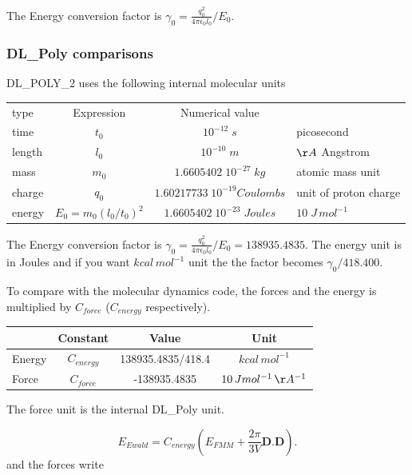 \documentclass[12pt]{article} %
\begin{document}
The Energy conversion factor is $\displaystyle \gamma_0 = \frac{q_0^2}{4 \pi\epsilon_0 l_0}/E_0 $. 


\subsubsection{DL\_Poly comparisons}
DL\_POLY\_2 uses the following internal molecular units \\

\begin{tabular}{|l|c|c|l|}
\hline
type & Expression & Numerical value & \\
time &$t_0$ & $10^{-12}\;s$& picosecond\\
length & $l_0$ &$10^{-10}\; m $& $\AA$ Angstrom\\
mass &  $m_0$ & $ 1.6605402 \; 10^{−27}\; kg $& atomic mass unit\\
charge &  $q_0$ & $1.60217733 \; 10^{−19} Coulombs$& unit of proton charge\\
energy & $E_0 = m_0(l_0/t_0)^2$&$1.6605402 \;  10^{−23}\; Joules $ & $10\; J\, mol^{-1}$\\
\hline
\end{tabular}
The Energy conversion factor is $\displaystyle \gamma_0 = \frac{q_0^2}{4 \pi\epsilon_0 l_0}/E_0 = 138935.4835$. The energy unit is in Joules and if you want $kcal\, mol^{-1}$ unit the the factor becomes $\gamma_0/418.400$.

To compare with the molecular dynamics code, the forces and the energy is multiplied by $C_{force}$ ($C_{energy}$ respectively). 
\begin{center}
\begin{tabular}{|l|c|c|c|}
\hline
   & Constant & Value &  Unit \\
\hline
Energy & $C_{energy}$& 138935.4835/418.4 &  $kcal\, mol^{-1}$\\
Force &$C_{force}$& -138935.4835 &  $10\,J  mol^{-1}\, \AA^{-1}$\\
\hline
\end{tabular}
\end{center}
The force unit is the internal DL\_Poly unit.


\begin{equation}
E_{Ewald} = C_{energy} \left (  E_{FMM} + \frac{2\pi}{3V} 
\mathbf{D}.\mathbf{D}  \right ).
\end{equation}
and the forces write 
\end{document}
